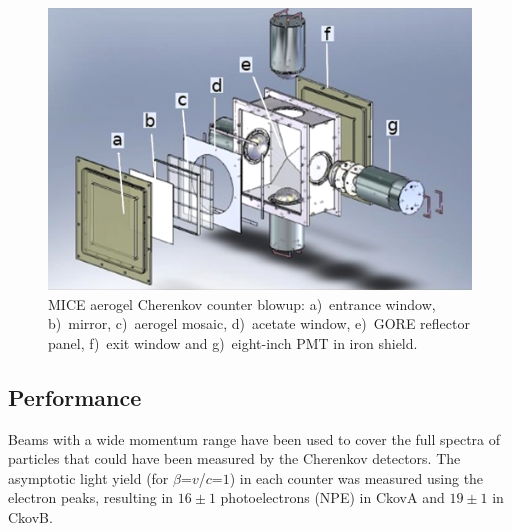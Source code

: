 \begin{figure}[htb!]
  \begin{center}
    \includegraphics[width=0.6\columnwidth]{./03-Ckov/Figures/Ckov_fix.png}
    \caption{MICE aerogel Cherenkov counter blowup: a)~entrance window, b)~mirror, c)~aerogel mosaic, d)~acetate window, e)~GORE reflector panel, f)~exit window and g)~eight-inch PMT in iron shield.}
    \label{fig:ckov1}
  \end{center}
\end{figure}

\subsection{Performance}
\label{SubSect:Ckov_Performance}

Beams with a wide momentum range have been used to cover the full spectra of particles that could have been measured by the Cherenkov detectors.
The asymptotic light yield (for $\beta$=$v$/$c$=$1$) in each counter was measured using the electron peaks, resulting in $16\pm1$ photoelectrons (NPE) in CkovA and $19\pm1$ in CkovB.



